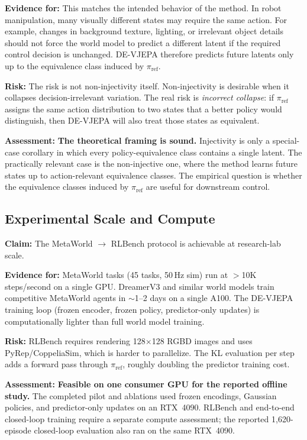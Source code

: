 \documentclass[10pt,twocolumn]{article}
\theoremstyle{tightstyle}
\begin{document}
\medskip
\textbf{Evidence for:}
This matches the intended behavior of the method.
In robot manipulation, many visually different states may require the same action.
For example, changes in background texture, lighting, or irrelevant object details
should not force the world model to predict a different latent if the required
control decision is unchanged.
DE-VJEPA therefore predicts future latents only up to the equivalence class induced
by $\pi_{\mathrm{ref}}$.

\medskip
\textbf{Risk:}
The risk is not non-injectivity itself.
Non-injectivity is desirable when it collapses decision-irrelevant variation.
The real risk is \emph{incorrect collapse}: if $\pi_{\mathrm{ref}}$ assigns the same
action distribution to two states that a better policy would distinguish, then
DE-VJEPA will also treat those states as equivalent.

\medskip
\textbf{Assessment:}
\textcolor{feasgreen}{\textbf{The theoretical framing is sound.}}
Injectivity is only a special-case corollary in which every policy-equivalence
class contains a single latent.
The practically relevant case is the non-injective one, where the method learns
future states up to action-relevant equivalence classes.
The empirical question is whether the equivalence classes induced by
$\pi_{\mathrm{ref}}$ are useful for downstream control.

\subsection{Experimental Scale and Compute}

\textbf{Claim:} The MetaWorld $\to$ RLBench protocol is achievable at research-lab scale.

\medskip
\textbf{Evidence for:}
MetaWorld tasks (45 tasks, 50\,Hz sim) run at $>$10K steps/second on a single GPU.
DreamerV3 and similar world models train competitive MetaWorld agents in $\sim$1--2
days on a single A100. The DE-VJEPA training loop (frozen encoder, frozen policy,
predictor-only updates) is computationally lighter than full world model training.

\medskip
\textbf{Risk:} RLBench requires rendering 128$\times$128 RGBD images and uses
PyRep/CoppeliaSim, which is harder to parallelize.
The KL evaluation per step adds a forward pass through $\pi_{\text{ref}}$, roughly
doubling the predictor training cost.

\medskip
\textbf{Assessment:} \textcolor{feasgreen}{\textbf{Feasible on one consumer GPU
for the reported offline study.}} The completed pilot and ablations used frozen
encodings, Gaussian policies, and predictor-only updates on an RTX~4090. RLBench
and end-to-end closed-loop training require a separate compute assessment; the
reported 1,620-episode closed-loop evaluation also ran on the same RTX~4090.
\end{document}
